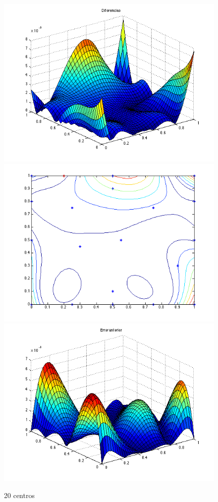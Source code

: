\documentclass[11pt,a4paper]{article}
\begin{document}
\begin{figure}[H]
\centering

\includegraphics[scale=0.35]{diferencias20.png}
\includegraphics[scale=0.35]{centros20.png}
\includegraphics[scale=0.35]{error20.png}
\caption{20 centros}
\end{figure}
\end{document}
